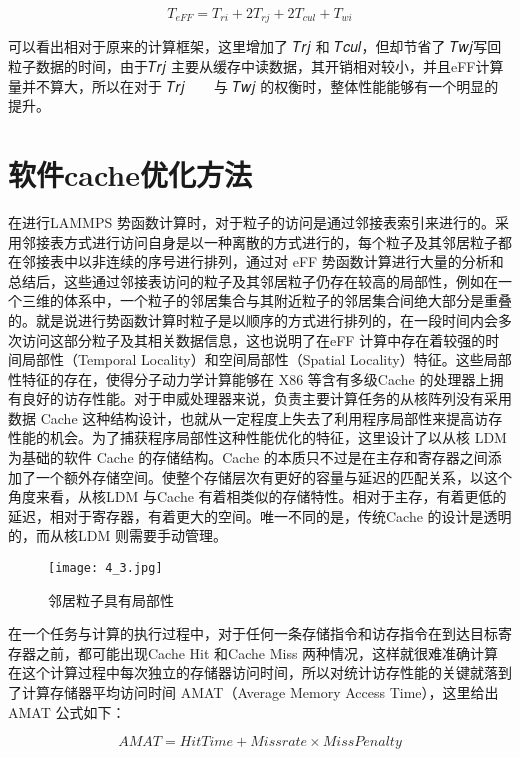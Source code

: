 \begin{equation}
  T_{eFF}=T_{ri}+2T_{rj}+2T_{cul}+T_{wi}
\end{equation}

可以看出相对于原来的计算框架，这里增加了 𝑇𝑟𝑗 和 𝑇𝑐𝑢𝑙，但却节省了 𝑇𝑤𝑗写回粒子数据的时间，由于𝑇𝑟𝑗 主要从缓存中读数据，其开销相对较小，并且eFF计算量并不算大，所以在对于 𝑇𝑟𝑗 􀀁𝑇𝑐𝑢𝑙 与 𝑇𝑤𝑗 的权衡时，整体性能能够有一个明显的提升。

\section{软件cache优化方法}
在进行LAMMPS 势函数计算时，对于粒子的访问是通过邻接表索引来进行的。采用邻接表方式进行访问自身是以一种离散的方式进行的，每个粒子及其邻居粒子都在邻接表中以非连续的序号进行排列，通过对 eFF 势函数计算进行大量的分析和总结后，这些通过邻接表访问的粒子及其邻居粒子仍存在较高的局部性，例如在一个三维的体系中，一个粒子的邻居集合与其附近粒子的邻居集合间绝大部分是重叠的。就是说进行势函数计算时粒子是以顺序的方式进行排列的，在一段时间内会多次访问这部分粒子及其相关数据信息，这也说明了在eFF 计算中存在着较强的时间局部性（Temporal Locality）和空间局部性（Spatial Locality）特征。这些局部性特征的存在，使得分子动力学计算能够在 X86 等含有多级Cache 的处理器上拥有良好的访存性能。对于申威处理器来说，负责主要计算任务的从核阵列没有采用数据 Cache 这种结构设计，也就从一定程度上失去了利用程序局部性来提高访存性能的机会。为了捕获程序局部性这种性能优化的特征，这里设计了以从核 LDM 为基础的软件 Cache 的存储结构。Cache 的本质只不过是在主存和寄存器之间添加了一个额外存储空间。使整个存储层次有更好的容量与延迟的匹配关系，以这个角度来看，从核LDM 与Cache 有着相类似的存储特性。相对于主存，有着更低的延迟，相对于寄存器，有着更大的空间。唯一不同的是，传统Cache 的设计是透明的，而从核LDM 则需要手动管理。

 \begin{figure}[h]
  \centering
  \texttt{[image: 4\_3.jpg]}
  \caption{邻居粒子具有局部性}
\end{figure}

 在一个任务与计算的执行过程中，对于任何一条存储指令和访存指令在到达目标寄存器之前，都可能出现Cache Hit 和Cache Miss 两种情况，这样就很难准确计算在这个计算过程中每次独立的存储器访问时间，所以对统计访存性能的关键就落到了计算存储器平均访问时间 AMAT（Average Memory Access Time），这里给出 AMAT 公式如下：

 \begin{equation}
   AMAT = HitTime+Missrate \times MissPenalty
 \end{equation}

